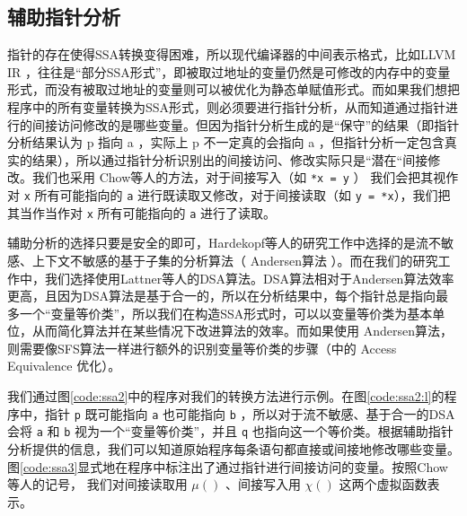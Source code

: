 \subsection{辅助指针分析}

指针的存在使得SSA转换变得困难，所以现代编译器的中间表示格式，比如LLVM IR \supercite{llvm}，往往是“部分SSA形式”，即被取过地址的变量仍然是可修改的内存中的变量形式，而没有被取过地址的变量则可以被优化为静态单赋值形式。而如果我们想把程序中的所有变量转换为SSA形式，则必须要进行指针分析，从而知道通过指针进行的间接访问修改的是哪些变量。但因为指针分析生成的是“保守”的结果（即指针分析结果认为 p 指向 a ，实际上 p 不一定真的会指向 a ，但指针分析一定包含真实的结果），所以通过指针分析识别出的间接访问、修改实际只是“潜在“间接修改。我们也采用 Chow等人\supercite{Chow:1996}的方法，对于间接写入（如 \verb|*x = y| ） 我们会把其视作对  \verb|x| 所有可能指向的 \verb|a| 进行既读取又修改，对于间接读取（如 \verb|y = *x|），我们把其当作当作对 \verb|x| 所有可能指向的 \verb|a| 进行了读取。

辅助分析的选择只要是安全的即可，Hardekopf等人的研究工作\supercite{Hardekopf2011}中选择的是流不敏感、上下文不敏感的基于子集的分析算法（ Andersen算法 ）。而在我们的研究工作中，我们选择使用Lattner等人的DSA算法。DSA算法相对于Andersen算法效率更高，且因为DSA算法是基于合一的，所以在分析结果中，每个指针总是指向最多一个“变量等价类”，所以我们在构造SSA形式时，可以以变量等价类为基本单位，从而简化算法并在某些情况下改进算法的效率。而如果使用 Andersen算法，则需要像SFS算法一样进行额外的识别变量等价类的步骤（\cite{Hardekopf2011}中的 Access Equivalence 优化）。

我们通过图\ref{code:ssa2}中的程序对我们的转换方法进行示例。在图\ref{code:ssa2:l}的程序中，指针 \verb|p| 既可能指向 \verb|a| 也可能指向 \verb|b| ，所以对于流不敏感、基于合一的DSA会将 \verb|a| 和 \verb|b| 视为一个“变量等价类”，并且 \verb|q| 也指向这一个等价类。根据辅助指针分析提供的信息，我们可以知道原始程序每条语句都直接或间接地修改哪些变量。图\ref{code:ssa3}显式地在程序中标注出了通过指针进行间接访问的变量。按照Chow等人的记号\supercite{Chow:1996}， 我们对间接读取用 $\mu()$ 、间接写入用 $\chi()$ 这两个虚拟函数表示。

